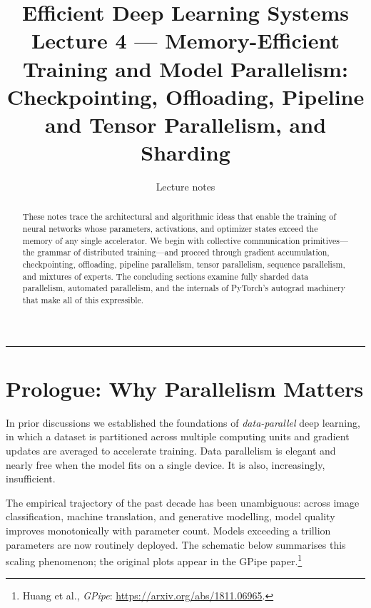 \documentclass[11pt,a4paper]{article}
\title{\textbf{Efficient Deep Learning Systems} \\[0.3em]
       \large Lecture 4 --- Memory-Efficient Training and Model Parallelism: \\
       Checkpointing, Offloading, Pipeline and Tensor Parallelism, and Sharding}
\author{Lecture notes}
\date{}
\theoremstyle{definition}
\theoremstyle{remark}
\theoremstyle{plain}
\begin{document}
\sloppy
\maketitle

\begin{abstract}
\noindent
These notes trace the architectural and algorithmic ideas that enable the
training of neural networks whose parameters, activations, and optimizer
states exceed the memory of any single accelerator. We begin with
collective communication primitives---the grammar of distributed
training---and proceed through gradient accumulation, checkpointing,
offloading, pipeline parallelism, tensor parallelism, sequence
parallelism, and mixtures of experts. The concluding sections examine
fully sharded data parallelism, automated parallelism, and the internals
of PyTorch's autograd machinery that make all of this expressible.
\end{abstract}

\tableofcontents
\bigskip
\hrule
\bigskip

\section{Prologue: Why Parallelism Matters}

In prior discussions we established the foundations of
\emph{data-parallel} deep learning, in which a dataset is partitioned
across multiple computing units and gradient updates are averaged to
accelerate training. Data parallelism is elegant and nearly free when the
model fits on a single device. It is also, increasingly, insufficient.

The empirical trajectory of the past decade has been unambiguous: across
image classification, machine translation, and generative modelling,
model quality improves monotonically with parameter count. Models
exceeding a trillion parameters are now routinely deployed. The schematic
below summarises this scaling phenomenon; the original plots appear in the
GPipe paper.\footnote{Huang et al., \textit{GPipe}:
\url{https://arxiv.org/abs/1811.06965}.}
\end{document}
